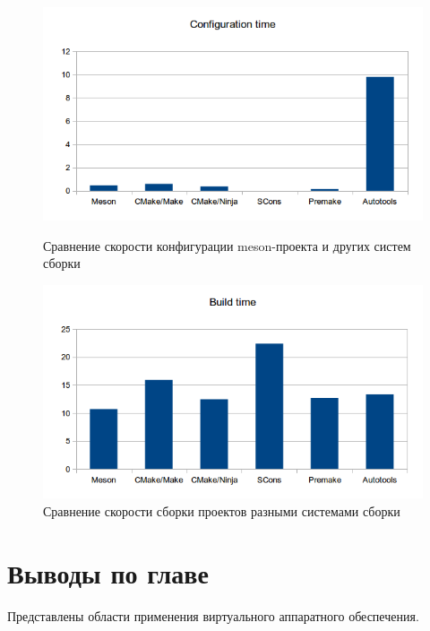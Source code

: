 \begin{figure}[!htbp]
    \centering
    \begin{adjustbox}{max totalsize={\textwidth}{\textheight}}
        \includegraphics[]{images/conftime.png}
    \end{adjustbox}
    \caption{Сравнение скорости конфигурации meson-проекта и других систем сборки}\label{fig:meson-conftime}

    \begin{adjustbox}{max totalsize={\textwidth}{\textheight}}
        \includegraphics[]{images/buildtime.png}
    \end{adjustbox}
    \caption{Сравнение скорости сборки проектов разными системами сборки}\label{fig:ninja-buildtime}
\end{figure}


\section*{Выводы по главе}\label{sec:ch1/sec5}

Представлены области применения виртуального аппаратного
обеспечения.

